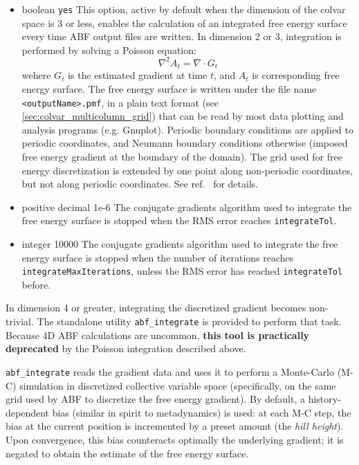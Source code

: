 \begin{itemize}
  \item {}
{boolean}
{\texttt{yes}}
{
  This option, active by default when the dimension of the colvar space is 3 or less, enables the calculation of an integrated free energy surface every time ABF output files are written.
  In dimension 2 or 3, integration is performed by solving a Poisson equation:~\cite{Henin2021}
  \begin{equation}
   \nabla^2 A_t = \nabla \cdot G_t
  \end{equation}
  wehere $G_t$ is the estimated gradient at time $t$, and $A_t$ is corresponding free energy surface.
  The free energy surface is written under the file name \texttt{<outputName>.pmf},
  in a plain text format (see \ref{sec:colvar_multicolumn_grid}) that can be read by most data plotting
  and analysis programs (e.g.{} Gnuplot).
  Periodic boundary conditions are applied to periodic coordinates, and Neumann boundary
  conditions otherwise (imposed free energy gradient at the boundary of the domain).
  The grid used for free energy discretization is extended by one point along
  non-periodic coordinates, but not along periodic coordinates. See ref.~\cite{Henin2021}
  for details.
}

\item {}
{positive decimal}
{1e-6}
{
  The conjugate gradients algorithm used to integrate the free energy surface
  is stopped when the RMS error reaches \texttt{integrateTol}.
}


\item {}
{integer}
{10000}
{
  The conjugate gradients algorithm used to integrate the free energy surface
  is stopped when the number of iterations reaches \texttt{integrateMaxIterations},
  unless the RMS error has reached \texttt{integrateTol} before.
}
\end{itemize}


In dimension 4 or greater, integrating the discretized gradient becomes non-trivial. The
standalone utility \texttt{abf\_integrate} is provided to perform that task.
Because 4D ABF calculations are uncommon, \textbf{this tool is practically deprecated} by
the Poisson integration described above.

\texttt{abf\_integrate} reads the gradient data and uses it to perform a Monte-Carlo (M-C)
simulation in discretized collective variable space (specifically, on the same grid
used by ABF to discretize the free energy gradient).
By default, a history-dependent bias (similar in spirit to metadynamics) is used:
at each M-C step, the bias at the current position is incremented by a preset amount
(the \emph{hill height}).
Upon convergence, this bias counteracts optimally the underlying gradient;
it is negated to obtain the estimate of the free energy surface.

